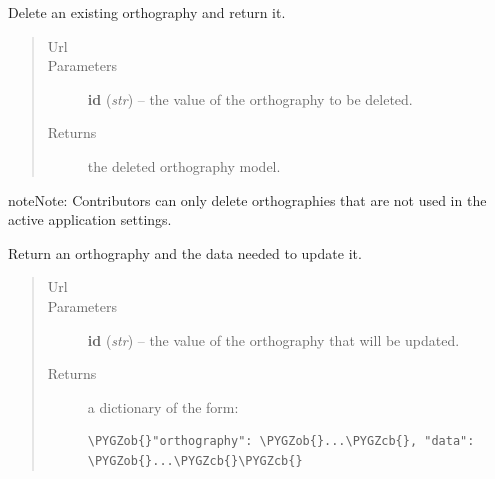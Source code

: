 \documentclass[letterpaper,10pt,english]{sphinxmanual}
\def\PYGZob{\char`\{}
\def\PYGZcb{\char`\}}
\begin{document}
\begin{fulllineitems}

\begin{fulllineitems}
\label{api:onlinelinguisticdatabase.controllers.orthographies.OrthographiesController.delete}
Delete an existing orthography and return it.
\begin{quote}\begin{description}
\item[{Url }] \leavevmode
{}

\item[{Parameters}] \leavevmode
\textbf{id} (\emph{str}) -- the  value of the orthography to be deleted.

\item[{Returns}] \leavevmode
the deleted orthography model.

\end{description}\end{quote}

\begin{notice}{note}{Note:}
Contributors can only delete orthographies that are not used in the
active application settings.
\end{notice}

\end{fulllineitems}


\begin{fulllineitems}
\label{api:onlinelinguisticdatabase.controllers.orthographies.OrthographiesController.edit}
Return an orthography and the data needed to update it.
\begin{quote}\begin{description}
\item[{Url }] \leavevmode
{}

\item[{Parameters}] \leavevmode
\textbf{id} (\emph{str}) -- the  value of the orthography that will be updated.

\item[{Returns}] \leavevmode

a dictionary of the form:

\begin{Verbatim}[commandchars=\\\{\}]
\PYGZob{}"orthography": \PYGZob{}...\PYGZcb{}, "data": \PYGZob{}...\PYGZcb{}\PYGZcb{}
\end{Verbatim}


\end{description}
\end{quote}
\end{fulllineitems}
\end{fulllineitems}
\end{document}
